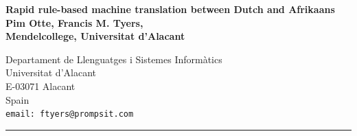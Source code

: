 \documentclass[a0,landscape]{a0poster}
\begin{document}

\begin{minipage}[b]{0.75\linewidth} 
\veryHuge \bf 
\textsf{Rapid rule-based machine translation between Dutch and Afrikaans}
\\[1cm]
\huge \bf Pim Otte, Francis M. Tyers,\\
\huge \rm Mendelcollege, Universitat d'Alacant
\end{minipage}
\begin{minipage}[b]{0.25\linewidth} 
\Large Departament de Llenguatges i Sistemes Inform\`{a}tics\\
Universitat d'Alacant\\
E-03071 Alacant\\
Spain\\
\tt{email: ftyers@prompsit.com}
\end{minipage}
\vspace{0.3cm}
\hrule
\vspace{0.3cm}
%
\end{document}
